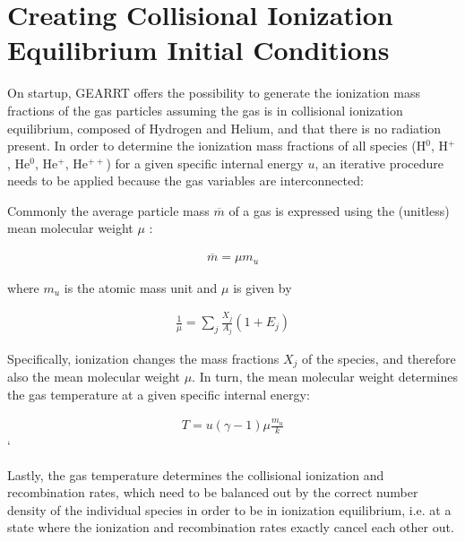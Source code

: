 








\clearpage
\section{Creating Collisional Ionization Equilibrium Initial Conditions}


On startup, GEARRT offers the possibility to generate the ionization mass fractions of the gas
particles assuming the gas is in collisional ionization equilibrium, composed of Hydrogen and
Helium, and that there is no radiation present. In order to determine the ionization mass fractions
of all species (H$^0$, H$^+$, He$^0$, He$^+$, He$^{++}$) for a given specific internal energy $u$,
an iterative procedure needs to be applied because the gas variables are interconnected:



Commonly the average particle mass $\overline{m}$ of a gas is expressed using the (unitless) mean
molecular weight $\mu$ :

\begin{align}
  \overline{m} = \mu m_u
\end{align}

where $m_u$ is the atomic mass unit and $\mu$ is given by

\begin{align}
    \frac{1}{\mu} = \sum_j \frac{X_j}{A_j} (1 + E_j)
\end{align}


Specifically, ionization changes the mass fractions $X_j$ of the species, and therefore also the
mean molecular weight $\mu$. In turn, the mean molecular weight determines the gas temperature at a
given specific internal energy:

\begin{align}
    T = u (\gamma - 1) \mu \frac{m_u}{k}
\end{align}`

Lastly, the gas temperature determines the collisional ionization and recombination rates, which
need to be balanced out by the correct number density of the individual species in order to be in
ionization equilibrium, i.e. at a state where the ionization and recombination rates exactly cancel
each other out.

